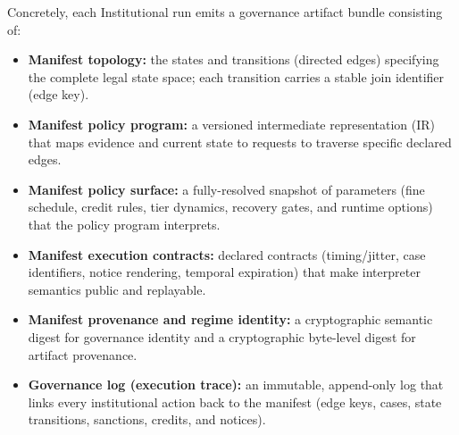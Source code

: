 \documentclass[11pt, a4paper]{article}
\begin{document}
Concretely, each Institutional run emits a governance artifact bundle consisting of:
\begin{itemize}
    \item \textbf{Manifest topology:} the states and transitions (directed edges) specifying the complete legal state space; each transition carries a stable join identifier (edge key).
    \item \textbf{Manifest policy program:} a versioned intermediate representation (IR) that maps evidence and current state to requests to traverse specific declared edges.
    \item \textbf{Manifest policy surface:} a fully-resolved snapshot of parameters (fine schedule, credit rules, tier dynamics, recovery gates, and runtime options) that the policy program interprets.
    \item \textbf{Manifest execution contracts:} declared contracts (timing/jitter, case identifiers, notice rendering, temporal expiration) that make interpreter semantics public and replayable.
    \item \textbf{Manifest provenance and regime identity:} a cryptographic semantic digest for governance identity and a cryptographic byte-level digest for artifact provenance.
    \item \textbf{Governance log (execution trace):} an immutable, append-only log that links every institutional action back to the manifest (edge keys, cases, state transitions, sanctions, credits, and notices).
\end{itemize}
\end{document}
